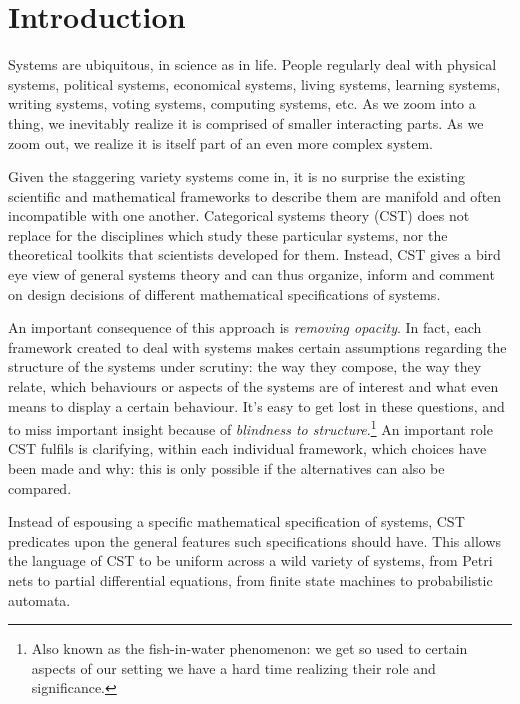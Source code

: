
\section{Introduction}
Systems are ubiquitous, in science as in life.
People regularly deal with physical systems, political systems, economical systems, living systems, learning systems, writing systems, voting systems, computing systems, etc.
As we zoom into a thing, we inevitably realize it is comprised of smaller interacting parts. As we zoom out, we realize it is itself part of an even more complex system.

Given the staggering variety systems come in, it is no surprise the existing scientific and mathematical frameworks to describe them are manifold and often incompatible with one another.
Categorical systems theory (CST) does not replace for the disciplines which study these particular systems, nor the theoretical toolkits that scientists developed for them.
Instead, CST gives a bird eye view of general systems theory and can thus organize, inform and comment on design decisions of different mathematical specifications of systems.


An important consequence of this approach is \emph{removing opacity}.
In fact, each framework created to deal with systems makes certain assumptions regarding the structure of the systems under scrutiny: the way they compose, the way they relate, which behaviours or aspects of the systems are of interest and what even means to display a certain behaviour.
It's easy to get lost in these questions, and to miss important insight because of \emph{blindness to structure}.\footnote{Also known as the fish-in-water phenomenon: we get so used to certain aspects of our setting we have a hard time realizing their role and significance.}
An important role CST fulfils is clarifying, within each individual framework, which choices have been made and why: this is only possible if the alternatives can also be compared.

Instead of espousing a specific mathematical specification of systems, CST predicates upon the general features such specifications should have.
This allows the language of CST to be uniform across a wild variety of systems, from Petri nets to partial differential equations, from finite state machines to probabilistic automata.


